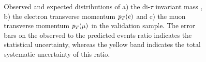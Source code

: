 \begin{figure}[tp]
     \begin{center}


    \end{center}
    \caption{ Observed and expected distributions  of a) the di-$\tau$ invariant mass
	\mmc, b) the electron transverse momentum $p_{T}(e)$ and c) the muon transverse momentum $p_{T}(\mu)$ in the \ttbar validation sample. 
	The error bars on the observed to the predicted events ratio indicates the statistical uncertainty,
	whereas the yellow band indicates the total systematic uncertainty of this ratio.} 
   \label{fig:kinematicsttbar}
\end{figure}


